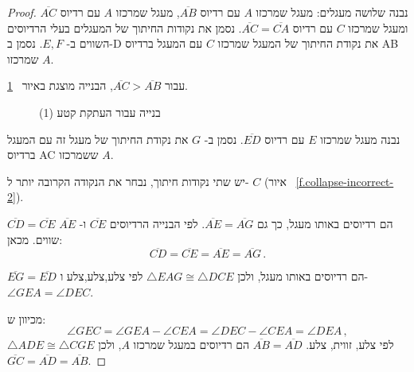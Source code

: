 \begin{proof}

נבנה שלושה מעגלים: מעגל שמרכזו
$A$
עם רדיוס
$\overline{AB}$,
מעגל שמרכזו
$A$
עם רדיוס
$\overline{AC}$
ומעגל שמרכזו
$C$
עם רדיוס
$\overline{AC}=\overline{CA}$.
נסמן את נקודות החיתוך של המעגלים בעלי הרדיוסים השווים 
ב-%
$E,F$.
נסמן ב-D את נקודת החיתוך של המעגל שמרכזו
$C$
עם המעגל ברדיוס AB שמרכזו 
$A$.

עבור
$\overline{AC}>\overline{AB}$,
הבנייה מוצגת באיור%
~\ref{f.collapse-incorrect-1}.
\begin{figure}[tb]
\begin{center}
\end{center}
\caption{בנייה עבור העתקת קטע (1)}\label{f.collapse-incorrect-1}
\end{figure}

נבנה מעגל שמרכזו 
$E$
עם רדיוס 
$\overline{ED}$.
נסמן ב-%
$G$
את נקודת החיתוך של מעגל זה עם המעגל ברדיוס AC ששמרכזו
$A$.

יש שתי נקודות חיתוך, נבחר את הנקודה הקרובה יותר ל-%
$C$
(איור~%
\ref{f.collapse-incorrect-2}).

$\overline{CD}=\overline{CE}$
הם רדיוסים באותו מעגל, כך גם
$\overline{AE}=\overline{AG}$.
לפי הבנייה הרדיוסים 
$\overline{CE}$
ו-%
$\overline{AE}$
שווים. מכאן:
\[
\overline{CD} = \overline{CE} = \overline{AE} = \overline{AG}\,.
\]

\newpage

$\overline{EG} = \overline{ED}$
הם רדיוסים באותו מעגל, ולכן
$\triangle EAG\cong \triangle DCE$
לפי צלע,צלע,צלע ו-%
$\angle GEA = \angle DEC$.

מכיוון ש:
\[
\angle GEC = \angle GEA \!-\!\angle CEA = \angle DEC\!-\!\angle CEA = \angle DEA\,,
\]
$\triangle ADE\cong\triangle CGE$ 
לפי צלע, זווית, צלע.
$\overline{AB}=\overline{AD}$
הם רדיוסים במעגל שמרכזו
$A$,
ולכן
$\overline{GC}=\overline{AD}=\overline{AB}$.
\end{proof}

